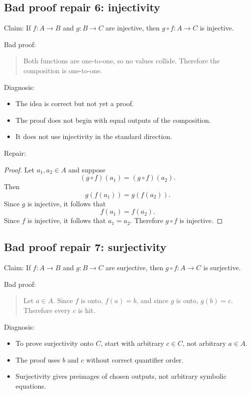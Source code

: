 \subsection{Bad proof repair 6: injectivity}

Claim: If $f:A\to B$ and $g:B\to C$ are injective, then $g\circ f:A\to C$ is injective.

Bad proof:

\begin{quote}
Both functions are one-to-one, so no values collide. Therefore the composition is one-to-one.
\end{quote}

Diagnosis:

\begin{itemize}
\item The idea is correct but not yet a proof.
\item The proof does not begin with equal outputs of the composition.
\item It does not use injectivity in the standard direction.
\end{itemize}

Repair:

\begin{proof}
Let $a_1,a_2\in A$ and suppose
\[
(g\circ f)(a_1)=(g\circ f)(a_2).
\]
Then
\[
g(f(a_1))=g(f(a_2)).
\]
Since $g$ is injective, it follows that
\[
f(a_1)=f(a_2).
\]
Since $f$ is injective, it follows that $a_1=a_2$. Therefore $g\circ f$ is injective.
\end{proof}

\subsection{Bad proof repair 7: surjectivity}

Claim: If $f:A\to B$ and $g:B\to C$ are surjective, then $g\circ f:A\to C$ is surjective.

Bad proof:

\begin{quote}
Let $a\in A$. Since $f$ is onto, $f(a)=b$, and since $g$ is onto, $g(b)=c$. Therefore every $c$ is hit.
\end{quote}

Diagnosis:

\begin{itemize}
\item To prove surjectivity onto $C$, start with arbitrary $c\in C$, not arbitrary $a\in A$.
\item The proof uses $b$ and $c$ without correct quantifier order.
\item Surjectivity gives preimages of chosen outputs, not arbitrary symbolic equations.
\end{itemize}


